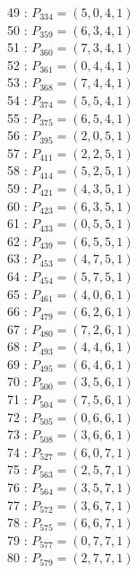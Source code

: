 \documentclass{article}
\begin{document}
{\begin{multicols}{3}
49 : $P_{334}=( 5, 0, 4, 1 )$\\
50 : $P_{359}=( 6, 3, 4, 1 )$\\
51 : $P_{360}=( 7, 3, 4, 1 )$\\
52 : $P_{361}=( 0, 4, 4, 1 )$\\
53 : $P_{368}=( 7, 4, 4, 1 )$\\
54 : $P_{374}=( 5, 5, 4, 1 )$\\
55 : $P_{375}=( 6, 5, 4, 1 )$\\
56 : $P_{395}=( 2, 0, 5, 1 )$\\
57 : $P_{411}=( 2, 2, 5, 1 )$\\
58 : $P_{414}=( 5, 2, 5, 1 )$\\
59 : $P_{421}=( 4, 3, 5, 1 )$\\
60 : $P_{423}=( 6, 3, 5, 1 )$\\
61 : $P_{433}=( 0, 5, 5, 1 )$\\
62 : $P_{439}=( 6, 5, 5, 1 )$\\
63 : $P_{453}=( 4, 7, 5, 1 )$\\
64 : $P_{454}=( 5, 7, 5, 1 )$\\
65 : $P_{461}=( 4, 0, 6, 1 )$\\
66 : $P_{479}=( 6, 2, 6, 1 )$\\
67 : $P_{480}=( 7, 2, 6, 1 )$\\
68 : $P_{493}=( 4, 4, 6, 1 )$\\
69 : $P_{495}=( 6, 4, 6, 1 )$\\
70 : $P_{500}=( 3, 5, 6, 1 )$\\
71 : $P_{504}=( 7, 5, 6, 1 )$\\
72 : $P_{505}=( 0, 6, 6, 1 )$\\
73 : $P_{508}=( 3, 6, 6, 1 )$\\
74 : $P_{527}=( 6, 0, 7, 1 )$\\
75 : $P_{563}=( 2, 5, 7, 1 )$\\
76 : $P_{564}=( 3, 5, 7, 1 )$\\
77 : $P_{572}=( 3, 6, 7, 1 )$\\
78 : $P_{575}=( 6, 6, 7, 1 )$\\
79 : $P_{577}=( 0, 7, 7, 1 )$\\
80 : $P_{579}=( 2, 7, 7, 1 )$\\
\end{multicols}


%


%


}%
\end{document}
